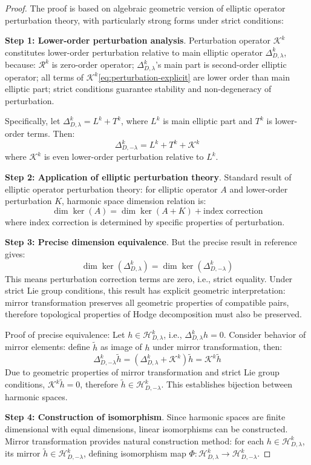 \documentclass[a4paper,12pt]{extarticle}
\theoremstyle{definition}
\begin{document}
\begin{proof}
The proof is based on algebraic geometric version of elliptic operator perturbation theory, with particularly strong forms under strict conditions:

\textbf{Step 1: Lower-order perturbation analysis}. Perturbation operator $\mathcal{K}^k$ constitutes lower-order perturbation relative to main elliptic operator $\Delta^k_{D,\lambda}$, because: $\mathcal{R}^k$ is zero-order operator; $\Delta^k_{D,\lambda}$'s main part is second-order elliptic operator; all terms of $\mathcal{K}^k$\eqref{eq:perturbation-explicit} are lower order than main elliptic part; strict conditions guarantee stability and non-degeneracy of perturbation.

Specifically, let $\Delta^k_{D,\lambda} = L^k + T^k$, where $L^k$ is main elliptic part and $T^k$ is lower-order terms. Then:
$$\Delta^k_{D,-\lambda} = L^k + T^k + \mathcal{K}^k$$
where $\mathcal{K}^k$ is even lower-order perturbation relative to $L^k$.

\textbf{Step 2: Application of elliptic perturbation theory}. Standard result of elliptic operator perturbation theory: for elliptic operator $A$ and lower-order perturbation $K$, harmonic space dimension relation is:
$$\dim \ker(A) = \dim \ker(A + K) + \text{index correction}$$
where index correction is determined by specific properties of perturbation.

\textbf{Step 3: Precise dimension equivalence}. But the precise result in reference\cite{zheng2025mirror} gives:
$$\dim \ker(\Delta^k_{D,\lambda}) = \dim \ker(\Delta^k_{D,-\lambda})$$
This means perturbation correction terms are zero, i.e., strict equality. Under strict Lie group conditions, this result has explicit geometric interpretation: mirror transformation preserves all geometric properties of compatible pairs, therefore topological properties of Hodge decomposition must also be preserved.

Proof of precise equivalence: Let $h \in \mathcal{H}^k_{D,\lambda}$, i.e., $\Delta^k_{D,\lambda} h = 0$. Consider behavior of mirror elements: define $\tilde{h}$ as image of $h$ under mirror transformation, then:
$$\Delta^k_{D,-\lambda} \tilde{h} = (\Delta^k_{D,\lambda} + \mathcal{K}^k) \tilde{h} = \mathcal{K}^k \tilde{h}$$
Due to geometric properties of mirror transformation and strict Lie group conditions, $\mathcal{K}^k \tilde{h} = 0$, therefore $\tilde{h} \in \mathcal{H}^k_{D,-\lambda}$. This establishes bijection between harmonic spaces.

\textbf{Step 4: Construction of isomorphism}. Since harmonic spaces are finite dimensional with equal dimensions, linear isomorphisms can be constructed. Mirror transformation provides natural construction method: for each $h \in \mathcal{H}^k_{D,\lambda}$, its mirror $\tilde{h} \in \mathcal{H}^k_{D,-\lambda}$, defining isomorphism map $\Phi: \mathcal{H}^k_{D,\lambda} \to \mathcal{H}^k_{D,-\lambda}$.


\end{proof}
\end{document}

